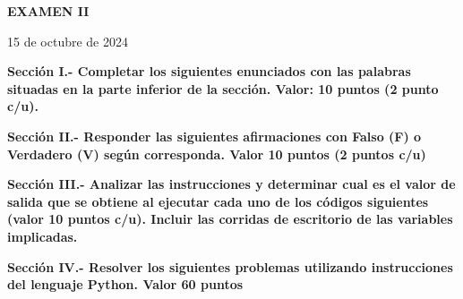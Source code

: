 \documentclass[10pt,addpoints]{exam}
\begin{document}
\begin{center}
  \sffamily\textbf{EXAMEN II}
\end{center}
\begin{flushright}
15 de octubre de 2024
\end{flushright}

\begin{questions}
\begin{EnvFullwidth}
  \sffamily\textbf{Sección I.- Completar los siguientes enunciados con las
  palabras situadas en la parte inferior de la sección. Valor: 10 puntos
  (2 punto c/u).}
\end{EnvFullwidth}








\end{questions}

\begin{questions}
\begin{EnvFullwidth}
  \sffamily\textbf{Sección II.- Responder las siguientes afirmaciones con
  Falso (F) o Verdadero (V) según corres\-ponda. Valor 10 puntos (2 puntos c/u)}
\end{EnvFullwidth}






\end{questions}


\begin{questions}
\begin{EnvFullwidth}
  \sffamily\textbf{Sección III.- Analizar las instrucciones y determinar
  cual es el valor de salida que se obtiene al ejecutar cada uno de los
  códigos siguientes (valor 10 puntos c/u). Incluir las corridas de
  escritorio de las variables implicadas.
  }
\end{EnvFullwidth}



%

\end{questions}

\begin{questions}
\begin{EnvFullwidth}
  \sffamily\textbf{Sección IV.- Resolver los siguientes problemas utilizando
  instrucciones del lenguaje Python. Valor 60 puntos}
\end{EnvFullwidth}


%
%

\end{questions}
\end{document}
